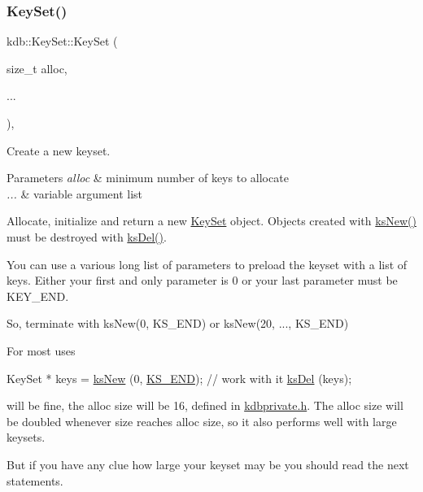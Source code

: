\subsubsection{\texorpdfstring{Key\+Set()}{KeySet()}\hspace{0.1cm}{\footnotesize\ttfamily [4/5]}}
{\footnotesize\ttfamily kdb\+::\+Key\+Set\+::\+Key\+Set (\begin{DoxyParamCaption}\item[{size\+\_\+t}]{alloc,  }\item[{}]{... }\end{DoxyParamCaption})\hspace{0.3cm}{\ttfamily [inline]}, {\ttfamily [explicit]}}



Create a new keyset. 


\begin{DoxyParams}{Parameters}
{\em alloc} & minimum number of keys to allocate \\
\hline
{\em ...} & variable argument list\\
\hline
\end{DoxyParams}
Allocate, initialize and return a new \hyperlink{classkdb_1_1KeySet}{Key\+Set} object. Objects created with \hyperlink{group__keyset_ga671e1aaee3ae9dc13b4834a4ddbd2c3c}{ks\+New()} must be destroyed with \hyperlink{group__keyset_ga27e5c16473b02a422238c8d970db7ac8}{ks\+Del()}.

You can use a various long list of parameters to preload the keyset with a list of keys. Either your first and only parameter is 0 or your last parameter must be K\+E\+Y\+\_\+\+E\+ND.

So, terminate with ks\+New(0, K\+S\+\_\+\+E\+N\+D) or ks\+New(20, ..., K\+S\+\_\+\+E\+ND)

For most uses


\begin{DoxyCodeInclude}
KeySet * keys = \hyperlink{group__keyset_ga671e1aaee3ae9dc13b4834a4ddbd2c3c}{ksNew} (0, \hyperlink{kdbenum_8c_a7a28fce3773b2c873c94ac80b8b4cd54}{KS\_END});
\textcolor{comment}{// work with it}
\hyperlink{group__keyset_ga27e5c16473b02a422238c8d970db7ac8}{ksDel} (keys);
\end{DoxyCodeInclude}
 will be fine, the alloc size will be 16, defined in \hyperlink{kdbprivate_8h}{kdbprivate.\+h}. The alloc size will be doubled whenever size reaches alloc size, so it also performs well with large keysets.

But if you have any clue how large your keyset may be you should read the next statements.

